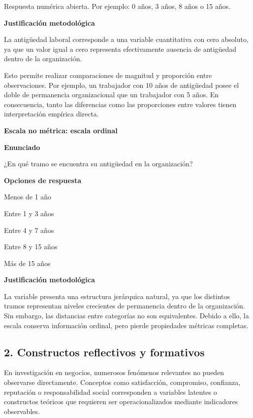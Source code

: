 \documentclass[12pt,letterpaper]{article}
\begin{document}
Respuesta numérica abierta. Por ejemplo: 0 años, 3 años, 8 años o 15 años.

\textbf{Justificación metodológica}

La antigüedad laboral corresponde a una variable cuantitativa con cero absoluto, ya que un valor igual a cero representa efectivamente ausencia de antigüedad dentro de la organización.

Esto permite realizar comparaciones de magnitud y proporción entre observaciones. Por ejemplo, un trabajador con 10 años de antigüedad posee el doble de permanencia organizacional que un trabajador con 5 años. En consecuencia, tanto las diferencias como las proporciones entre valores tienen interpretación empírica directa.

\textbf{Escala no métrica: escala ordinal}

\textbf{Enunciado}

¿En qué tramo se encuentra su antigüedad en la organización?

\textbf{Opciones de respuesta}

\begin{opciones}
\item Menos de 1 año
\item Entre 1 y 3 años
\item Entre 4 y 7 años
\item Entre 8 y 15 años
\item Más de 15 años
\end{opciones}

\textbf{Justificación metodológica}

La variable presenta una estructura jerárquica natural, ya que los distintos tramos representan niveles crecientes de permanencia dentro de la organización. Sin embargo, las distancias entre categorías no son equivalentes. Debido a ello, la escala conserva información ordinal, pero pierde propiedades métricas completas.

\subsection*{2. Constructos reflectivos y formativos}

En investigación en negocios, numerosos fenómenos relevantes no pueden observarse directamente. Conceptos como satisfacción, compromiso, confianza, reputación o responsabilidad social corresponden a variables latentes o constructos teóricos que requieren ser operacionalizados mediante indicadores observables.
\end{document}
